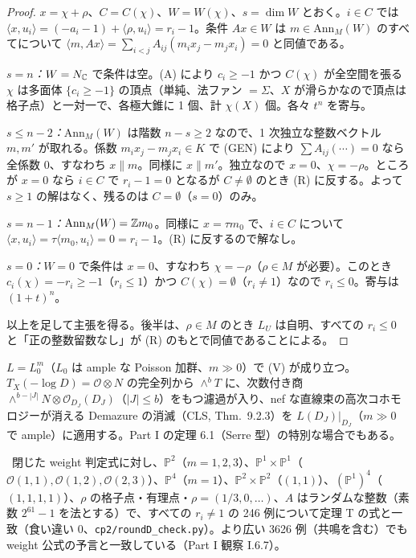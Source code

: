 \begin{proof}
$x=\chi+\rho$、$C=C(\chi)$、$W=W(\chi)$、$s=\dim W$ とおく。$i\in C$ では $\langle x,u_i\rangle=(-a_i-1)+\langle\rho,u_i\rangle=r_i-1$。条件 $Ax\in W$ は $m\in\mathrm{Ann}_M(W)$ のすべてについて $\langle m,Ax\rangle=\sum_{i<j}A_{ij}(m_ix_j-m_jx_i)=0$ と同値である。

\emph{$s=n$：}$W=N_\mathbb C$ で条件は空。(A) により $c_i\ge-1$ かつ $C(\chi)$ が全空間を張る $\chi$ は多面体 $\{c_i\ge-1\}$ の頂点（単純、法ファン $=\Sigma$、$X$ が滑らかなので頂点は格子点）と一対一で、各極大錐に 1 個、計 $\chi(X)$ 個。各々 $t^n$ を寄与。

\emph{$s\le n-2$：}$\mathrm{Ann}_M(W)$ は階数 $n-s\ge2$ なので、1 次独立な整数ベクトル $m,m'$ が取れる。係数 $m_ix_j-m_jx_i\in K$ で (GEN) により $\sum A_{ij}(\cdots)=0$ なら全係数 0、すなわち $x\parallel m$。同様に $x\parallel m'$。独立なので $x=0$、$\chi=-\rho$。ところが $x=0$ なら $i\in C$ で $r_i-1=0$ となるが $C\ne\emptyset$ のとき (R) に反する。よって $s\ge1$ の解はなく、残るのは $C=\emptyset$（$s=0$）のみ。

\emph{$s=n-1$：}$\mathrm{Ann}_M(W)=\mathbb Z m_0$。同様に $x=\tau m_0$ で、$i\in C$ について $\langle x,u_i\rangle=\tau\langle m_0,u_i\rangle=0=r_i-1$。(R) に反するので解なし。

\emph{$s=0$：}$W=0$ で条件は $x=0$、すなわち $\chi=-\rho$（$\rho\in M$ が必要）。このとき $c_i(\chi)=-r_i\ge-1$（$r_i\le1$）かつ $C(\chi)=\emptyset$（$r_i\ne1$）なので $r_i\le0$。寄与は $(1+t)^n$。

以上を足して主張を得る。後半は、$\rho\in M$ のとき $L_U$ は自明、すべての $r_i\le0$ と「正の整数留数なし」が (R) のもとで同値であることによる。\qedhere
\end{proof}
\begin{rem}[(V) について\ \tC]
$L=L_0^m$（$L_0$ は ample な Poisson 加群、$m\gg0$）で (V) が成り立つ。$T_X(-\log D)=\mathcal O\otimes N$ の完全列から $\wedge^bT$ に、次数付き商 $\wedge^{b-|J|}N\otimes\mathcal O_{D_J}(D_J)$（$|J|\le b$）をもつ濾過が入り、nef な直線束の高次コホモロジーが消える Demazure の消滅（CLS, Thm.\ 9.2.3\tQ）を $L(D_J)|_{D_J}$（$m\gg0$ で ample）に適用する。Part I の定理 6.1（Serre 型）の特別な場合でもある。
\end{rem}
\tV\ 閉じた weight 判定式に対し、$\mathbb{P}^2$（$m=1,2,3$）、$\mathbb{P}^1\times\mathbb{P}^1$（$\mathcal O(1,1),\mathcal O(1,2),\mathcal O(2,3)$）、$\mathbb{P}^4$（$m=1$）、$\mathbb{P}^2\times\mathbb{P}^2$（$(1,1)$）、$(\mathbb{P}^1)^4$（$(1,1,1,1)$）、$\rho$ の格子点・有理点・$\rho=(1/3,0,\dots)$、$A$ はランダムな整数（素数 $2^{61}-1$ を法とする）で、すべての $r_i\ne1$ の 246 例について定理 T の式と一致（食い違い 0、\texttt{cp2/roundD\_check.py}）。より広い 3626 例（共鳴を含む）でも weight 公式の予言と一致している（Part I 観察 I.6.7）。

